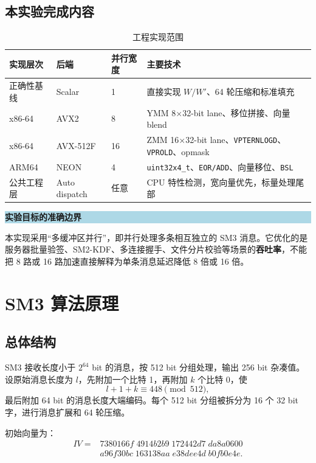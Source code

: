 \documentclass[UTF8,a4paper,12pt]{ctexart}
\newcommand{\code}[1]{\texttt{#1}}
\newenvironment{keybox}[1]{%
  \begin{center}\begin{minipage}{0.94\textwidth}
  \colorbox{lightblue}{\parbox{0.965\textwidth}{\textbf{#1}}}\vspace{0.35em}\par
}{%
  \end{minipage}\end{center}
}
\begin{document}
\subsection{本实验完成内容}
\begin{table}[H]
\centering
\caption{工程实现范围}
\begin{tabularx}{\textwidth}{p{2.5cm}p{2.1cm}p{2.2cm}X}
\toprule
实现层次 & 后端 & 并行宽度 & 主要技术 \\
\midrule
正确性基线 & Scalar & 1 & 直接实现 $W/W'$、64 轮压缩和标准填充 \\
\midrule
x86-64 & AVX2 & 8 & YMM 8$\times$32-bit lane、移位拼接、向量 blend \\
x86-64 & AVX-512F & 16 & ZMM 16$\times$32-bit lane、\code{VPTERNLOGD}、\code{VPROLD}、opmask \\
ARM64 & NEON & 4 & \code{uint32x4\_t}、\code{EOR/ADD}、向量移位、\code{BSL} \\
\midrule
公共工程层 & Auto dispatch & 任意 & CPU 特性检测，宽向量优先，标量处理尾部 \\
\bottomrule
\end{tabularx}
\end{table}

\begin{keybox}{实验目标的准确边界}
本实现采用“多缓冲区并行”，即并行处理多条相互独立的 SM3 消息。它优化的是服务器批量验签、SM2-KDF、多连接握手、文件分片校验等场景的\textbf{吞吐率}，不能把 8 路或 16 路加速直接解释为单条消息延迟降低 8 倍或 16 倍。
\end{keybox}

\section{SM3 算法原理}

\subsection{总体结构}
SM3 接收长度小于 $2^{64}$ bit 的消息，按 512 bit 分组处理，输出 256 bit 杂凑值。设原始消息长度为 $l$，先附加一个比特 1，再附加 $k$ 个比特 0，使
\begin{equation}
  l+1+k \equiv 448 \pmod{512},
\end{equation}
最后附加 64 bit 的消息长度大端编码。每个 512 bit 分组被拆分为 16 个 32 bit 字，进行消息扩展和 64 轮压缩。

初始向量为：
\begin{align*}
IV={}&7380166f\;4914b2b9\;172442d7\;da8a0600\\
    &a96f30bc\;163138aa\;e38dee4d\;b0fb0e4e.
\end{align*}
\end{document}
